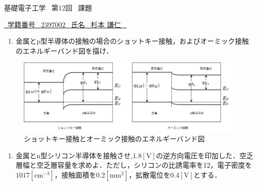 \documentclass{classes/report}
\begin{document}
基礎電子工学 \ 第12回 \ 課題
\begin{flushright}
    \underline{\ 学籍番号 \ 2397002 \ 氏名 \ 杉本 謙仁 \ }
\end{flushright}

\bigskip

\begin{enumerate}
    \item 金属とp型半導体の接触の場合のショットキー接触，およびオーミック接触のエネルギーバンド図を描け．
\end{enumerate}

\begin{figure}[H]
    \centering
    \includegraphics[width=1\linewidth]{figures/energyband.png}
    \caption{ショットキー接触とオーミック接触のエネルギーバンド図}
\end{figure}

\bigskip

\begin{enumerate}[resume]
    \item 金属とn型シリコン半導体を接触させ,$1.8 [\mathrm{V}]$の逆方向電圧を印加した．空乏層幅と空乏層容量を求めよ．ただし，シリコンの比誘電率を12，電子密度を$1017 [\mathrm{cm}^{-3}]$，接触面積を$0.2 [\mathrm{mm}^2]$，拡散電位を$0.4 [\mathrm{V}]$とする．
\end{enumerate}
\end{document}
